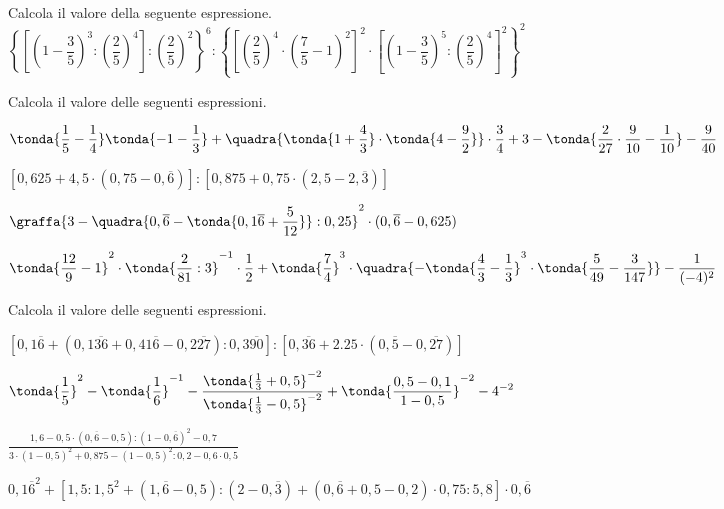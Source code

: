 \begin{esercizio}[*]
\label{ese:3.154}
Calcola il valore della seguente espressione. \\
\(
\left\{\left[\left(1-\dfrac{3}{5}\right)^3:\left(\dfrac{2}{5}\right)^{4}\right
]:
 \left(\dfrac{2}{5}\right)^{2} \right\}^{6}
:\left\{\left[\left(\dfrac{2}{5}\right)^{4}\cdot\left(\dfrac{7}{5}-
1\right)^2\right]^{2}\cdot%
\left[\left(1-\dfrac{3}{5}\right)^{5}:\left(\dfrac{2}{5}\right)^{4}
\right]^{2}\right\}^{2}
\)
\end{esercizio}


\begin{esercizio}[*]
\label{ese:3.155}
 Calcola il valore delle seguenti espressioni.
\begin{enumeratees}
\spazielenx
\item \(\displaystyle{\tonda{\frac{1}{5}-\frac{1}{4}}\tonda{-1-
\frac{1}{3}}+\quadra{\tonda{1+\frac{4}{3}}\cdot
\tonda{4-\frac{9}{2}}}\cdot{\frac{3}{4}}+3-\tonda{\frac{2}{27}
\cdot{\frac{9}{10}}-\frac{1}{10}}-\frac{9}{40}}\)
\item \(\displaystyle{\left[0,625+4,5\cdot(0,75-0,\overline{6})\right]:
\left[0,875+0,75\cdot(2,5-2,\overline{3})\right]}\)
\item \(\displaystyle{\graffa{3-\quadra{0,\overline{6}-\tonda{0,1\overline{6}+
\frac{5}{12}}}:0,25}^{2}\cdot
(0,\overline{6}-0,625)}\)
\item 
\(\displaystyle{\tonda{\frac{12}{9}-1}^{2}\cdot\tonda{\frac{2}{81}:3
}^{-1}\cdot\frac{1}{2}+\tonda{\frac{7}{4}}^{3}\cdot
\quadra{-\tonda{\frac{4}{3}-\frac{1}{3}}^{3}\cdot\tonda{\frac{5}{49}-
\frac{3}{147}}}-\frac{1}{(-4)^{2}}}\)
\end{enumeratees}
\end{esercizio}

\begin{esercizio}[*]
\label{ese:3.156}
 Calcola il valore delle seguenti espressioni.
\begin{enumeratees}
\spazielenx
\item \(\displaystyle{\left[0,1\overline{6}+(0,1\overline{36}+0,41
\overline{6}-0,2\overline{27}):0,3\overline{90}\right]:%
\left[0,\overline{36}+2.25\cdot(0,\overline{5}-0,\overline{27})\right]}\)
\item \(\displaystyle{\tonda{\frac{1}{5}}^{2}-\tonda{\frac{1}{6}
}^{-1}-\frac{\tonda{\frac{1}{3}+0,5}^{-2}}%
{\tonda{\frac{1}{3}-0,5}^{-2}}+\tonda{\frac{0,5-0,1}{1-0,5}
}^{-2}-4^{-2}}\)
\item \(\displaystyle{\frac{1,6-0,5\cdot(0,\overline{6}-0,5):(1-0,
\overline{6})^{2}-0,7}%
{3\cdot(1-0,5)^{2}+0,875-(1-0,5)^{2}:0,2-0,6\cdot0,5}}\)
\item \(\displaystyle{{0,1\overline{6}}^{2}+\left[1,5:1,5^{2}+\left(1,
\overline{6}-0,5\right):\left(2-0,\overline{3}\right)%
+\left(0,\overline{6}+0,5-0,2\right)\cdot0,75:5,8\right]\cdot 0,
\overline{6}}\)
\end{enumeratees}
\end{esercizio}

